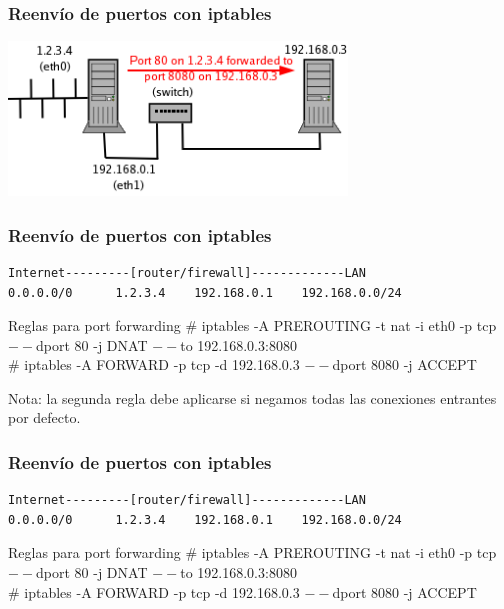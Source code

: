 \documentclass{beamer}
\begin{document}

\begin{frame}[fragile]
\frametitle{Reenvío de puertos con iptables}

  \begin{center}
    \includegraphics[width=9cm]{figs/port-forwarding.png}
  \end{center}

\end{frame}




\begin{frame}[fragile]
\frametitle{Reenvío de puertos con iptables}

\begin{verbatim}
Internet---------[router/firewall]-------------LAN 
0.0.0.0/0      1.2.3.4    192.168.0.1    192.168.0.0/24
\end{verbatim}

\begin{block}{Reglas para port forwarding}
\small
\# iptables -A PREROUTING -t nat -i eth0 -p tcp $--$dport 80 -j DNAT $--$to 192.168.0.3:8080 \\
\# iptables -A FORWARD -p tcp -d 192.168.0.3 $--$dport 8080 -j ACCEPT
\end{block}

Nota: la segunda regla debe aplicarse si negamos todas las conexiones entrantes por defecto. 

\end{frame}



\begin{frame}[fragile]
\frametitle{Reenvío de puertos con iptables}

\begin{verbatim}
Internet---------[router/firewall]-------------LAN 
0.0.0.0/0      1.2.3.4    192.168.0.1    192.168.0.0/24
\end{verbatim}

\begin{block}{Reglas para port forwarding}
\small
\# iptables -A PREROUTING -t nat -i eth0 -p tcp $--$dport 80 -j DNAT $--$to 192.168.0.3:8080 \\
\# iptables -A FORWARD -p tcp -d 192.168.0.3 $--$dport 8080 -j ACCEPT
\end{block}

\end{frame}
\end{document}
